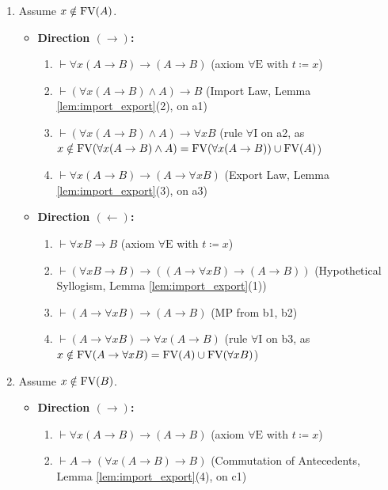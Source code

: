 \documentclass[10pt,a4paper]{article}
\begin{document}
\begin{enumerate}
\item Assume $x \notin {\textrm{FV}}(A)$.
  \begin{itemize}
  \item \textbf{Direction $(\to)$:}
    \begin{enumerate}
    \item[(a1)] $\vdash \forall x (A \to B) \to (A \to B)$ \hfill (axiom $\forall\textrm{E}$ with $t \coloneqq x$)
    \item[(a2)] $\vdash (\forall x (A \to B) \land A) \to B$ \hfill (Import Law, Lemma \ref{lem:import_export}(2), on a1)
    \item[(a3)] $\vdash (\forall x (A \to B) \land A) \to \forall x B$ \hfill (rule $\forall\textrm{I}$ on a2, as $x \notin {\textrm{FV}}(\forall x(A \to B) \land A) = {\textrm{FV}}(\forall x(A \to B)) \cup {\textrm{FV}}(A)$)
    \item[(a4)] $\vdash \forall x (A \to B) \to (A \to \forall x B)$ \hfill (Export Law, Lemma \ref{lem:import_export}(3), on a3)
    \end{enumerate}
  \item \textbf{Direction $(\leftarrow)$:}
    \begin{enumerate}
    \item[(b1)] $\vdash \forall x B \to B$ \hfill (axiom $\forall\textrm{E}$ with $t \coloneqq x$)
    \item[(b2)] $\vdash (\forall x B \to B) \to ((A \to \forall x B) \to (A \to B))$ \hfill (Hypothetical Syllogism, Lemma \ref{lem:import_export}(1))
    \item[(b3)] $\vdash (A \to \forall x B) \to (A \to B)$ \hfill ($\textrm{MP}$ from b1, b2)
    \item[(b4)] $\vdash (A \to \forall x B) \to \forall x (A \to B)$ \hfill (rule $\forall\textrm{I}$ on b3, as $x \notin {\textrm{FV}}(A \to \forall x B) = {\textrm{FV}}(A) \cup {\textrm{FV}}(\forall x B)$)
    \end{enumerate}
  \end{itemize}
\item Assume $x \notin {\textrm{FV}}(B)$.
  \begin{itemize}
  \item \textbf{Direction $(\to)$:}
    \begin{enumerate}
    \item[(c1)] $\vdash \forall x (A \to B) \to (A \to B)$ \hfill (axiom $\forall\textrm{E}$ with $t \coloneqq x$)
    \item[(c2)] $\vdash A \to (\forall x (A \to B) \to B)$ \hfill (Commutation of Antecedents, Lemma \ref{lem:import_export}(4), on c1)

\end{enumerate}
\end{itemize}
\end{enumerate}
\end{document}
